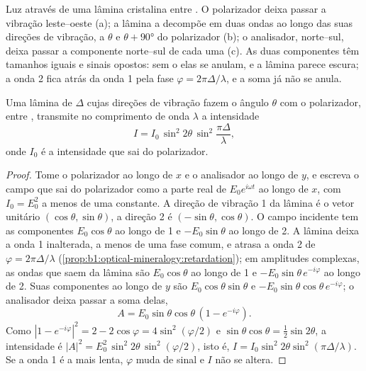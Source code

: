 \begin{omfigure}
{\small Luz através de uma lâmina cristalina entre . O polarizador deixa passar a vibração leste--oeste (a); a lâmina a decompõe em duas ondas ao longo das suas direções de vibração, a $\theta$ e $\theta + \ang{90}$ do polarizador (b); o analisador, norte--sul, deixa passar a componente norte--sul de cada uma (c). As duas componentes têm tamanhos iguais e sinais opostos: sem o  elas se anulam, e a lâmina parece escura; a onda 2 fica atrás da onda 1 pela fase $\varphi = 2\pi\Delta/\lambda$, e a soma já não se anula.}
\end{omfigure}

\begin{theorem}\label{thm:b1:optical-mineralogy:intensity}
Uma lâmina de  $\Delta$ cujas direções de vibração fazem o ângulo
$\theta$ com o polarizador, entre , transmite no comprimento de onda $\lambda$ a intensidade
\[
  I = I_0\,\sin^2 2\theta\,\sin^2\frac{\pi\Delta}{\lambda},
\]
onde $I_0$ é a intensidade que sai do polarizador.
\end{theorem}

\begin{proof}
Tome o polarizador ao longo de $x$ e o analisador ao longo de $y$, e escreva o campo que sai do polarizador como a parte real de $E_0 e^{i\omega t}$ ao longo de $x$, com
$I_0 = E_0^2$ a menos de uma constante. A direção de vibração 1 da lâmina é o vetor unitário $(\cos\theta, \sin\theta)$, a direção 2 é $(-\sin\theta, \cos\theta)$.
O campo incidente tem as componentes $E_0\cos\theta$ ao longo de 1 e
$-E_0\sin\theta$ ao longo de 2. A lâmina deixa a onda 1 inalterada, a menos de uma fase comum, e atrasa a onda 2 de $\varphi = 2\pi\Delta/\lambda$
(\cref{prop:b1:optical-mineralogy:retardation}); em amplitudes complexas, as ondas que saem da lâmina são $E_0\cos\theta$ ao longo de 1 e
$-E_0\sin\theta\,e^{-i\varphi}$ ao longo de 2. Suas componentes ao longo de $y$ são
$E_0\cos\theta\sin\theta$ e $-E_0\sin\theta\cos\theta\,e^{-i\varphi}$; o analisador deixa passar a soma delas,
\[
  A = E_0\sin\theta\cos\theta\,(1 - e^{-i\varphi}) .
\]
Como $|1 - e^{-i\varphi}|^2 = 2 - 2\cos\varphi = 4\sin^2(\varphi/2)$ e
$\sin\theta\cos\theta = \frac12\sin2\theta$, a intensidade é
$|A|^2 = E_0^2\,\sin^2 2\theta\,\sin^2(\varphi/2)$, isto é,
$I = I_0\sin^2 2\theta\sin^2(\pi\Delta/\lambda)$. Se a onda 1 é a mais lenta, $\varphi$ muda de sinal e $I$ não se altera.
\end{proof}

